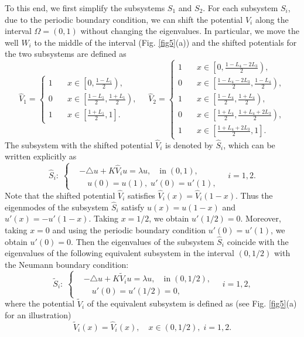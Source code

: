 \documentclass[a4paper,11pt]{article}
\begin{document}
To this end, we first simplify the subsystems $S_1$ and $S_2$. For each subsystem $S_i$, due to the periodic boundary condition, we can shift the potential $V_i$ along the interval $\Omega = (0,1)$ without changing the eigenvalues. In particular, we move the well $W_i$ to the middle of the interval (Fig. \ref{fig5}(a)) and the shifted potentials for the two subsystems are defined as
\begin{equation*}
\hat{V}_1 = \left\{
\begin{split}
1 & \quad x \in \left[ 0, \frac{1 - L_1}{2} \right), \\
0 & \quad x \in \left[ \frac{1 - L_1}{2}, \frac{1 + L_1}{2} \right), \\
1 & \quad x \in \left[ \frac{1 + L_1}{2}, 1 \right].
\end{split}
\right.
\quad
\hat{V}_2 = \left\{
\begin{split}
1 & \quad x \in \left[ 0, \frac{1 - L_4 - 2 L_3}{2} \right), \\
0 & \quad x \in \left[ \frac{1 - L_4 - 2 L_3}{2}, \frac{1 - L_4}{2} \right), \\
1 & \quad x \in \left[ \frac{1 - L_4}{2}, \frac{1 + L_4}{2} \right), \\
0 & \quad x \in \left[ \frac{1 + L_4}{2}, \frac{1 + L_4 + 2 L_3}{2} \right), \\
1 & \quad x \in \left[ \frac{1 + L_4 + 2 L_3}{2}, 1 \right].
\end{split}
\right.
\end{equation*}
The subsystem with the shifted potential $\hat{V}_i$ is denoted by $\hat{S}_i$, which can be written explicitly as
\begin{equation*}
\hat{S}_i: \;
\left\{
\begin{split}
& -\triangle u + K\hat{V}_i u = \lambda u, \quad \textrm{in} \; (0, 1), \\
& \quad u(0) = u(1), \; u'(0) =  u'(1),
\end{split}
\right.
\quad
i = 1, 2.
\end{equation*}
Note that the shifted potential $\hat{V}_i$ satisfies $\hat{V}_i(x) = \hat{V}_i(1-x)$. Thus the eigenmodes of the subsystem $\hat{S}_i$ satisfy $u(x) = u(1-x)$ and $u'(x) = -u'(1-x)$. Taking $x = 1/2$, we obtain $u'(1/2) = 0$. Moreover, taking $x = 0$ and using the periodic boundary condition $u'(0) = u'(1)$, we obtain $u'(0) = 0$. Then the eigenvalues of the subsystem $\hat{S}_i$ coincide with the eigenvalues of the following equivalent subsystem in the interval $(0, 1/2)$ with the Neumann boundary condition:
\begin{equation}\label{tildeS}
\tilde{S}_i: \;
\left\{
\begin{split}
& -\triangle u + K\tilde{V}_i u = \lambda u, \quad \textrm{in} \; (0, 1/2), \\
& \quad u'(0) = u'(1/2) =  0,
\end{split}
\right.
\quad
i = 1, 2,
\end{equation}
where the potential $\tilde{V}_i$ of the equivalent subsystem is defined as (see Fig. \ref{fig5}(a) for an illustration)
\begin{equation*}
\tilde{V}_i(x) = \hat{V}_i(x), \quad x \in (0, 1/2), \; i = 1, 2.
\end{equation*}
\end{document}

